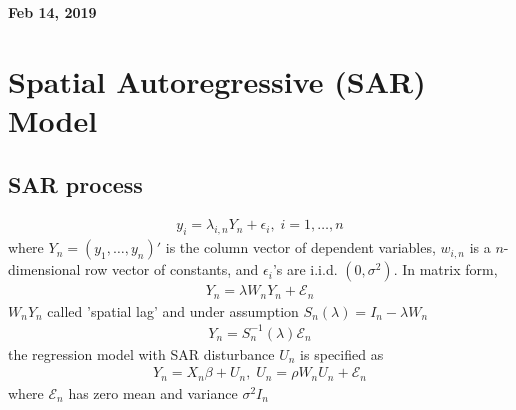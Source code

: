 \documentclass[11pt]{article}
\begin{document}
%

\newcommand{\Ito}{$It\hat{o}$'$s~Lemma$}

\newcommand\ind{\stackrel{\rm ind}{\sim}}
\newcommand\iid{\stackrel{\rm iid}{\sim}}
\renewcommand\c{\mathbf{c}}
\newcommand\y{\mathbf{y}}
\newcommand\z{\mathbf{z}}
\renewcommand\P{\mathbf{P}}
\newcommand\W{\mathbf{W}}
\newcommand\X{\mathbf{X}}
\newcommand\Y{\mathbf{Y}}
\newcommand\Z{\mathbf{Z}}
\newcommand\J{{\cal J}}
\newcommand\B{{\cal B}}
\newcommand\K{{\cal K}}
\newcommand\N{{\rm N}}
\newcommand\bs{\boldsymbol}
\newcommand\bth{\bs\theta}
\newcommand\bbe{\bs\beta}
\renewcommand\*{^\star}

\def\spacingset#1{\renewcommand{\baselinestretch}%
{#1}\small\normalsize} \spacingset{1}



  \bigskip
  \bigskip
  \bigskip
  \begin{center}
    {\LARGE\bf Feb 14, 2019 }
  \end{center}
  \medskip



\spacingset{1.45}



\section{Spatial Autoregressive (SAR) Model}
\subsection{SAR process}
\begin{align}
y_i = \lambda_{i,n}Y_n + \epsilon_i, \; i = 1 ,\dots , n \nonumber
\end{align}
where $Y_n = (y_1, \dots, y_n)'$ is the column vector of dependent variables, $w_{i,n}$ is a $n$-dimensional row vector of constants, and $\epsilon_i$'s are i.i.d. $(0,\sigma^2)$. In matrix form,
\begin{align}
Y_n = \lambda W_n Y_n + \mathcal{E}_n \nonumber
\end{align}
$W_n Y_n$ called 'spatial lag' and under assumption $S_n(\lambda) = I_n - \lambda W_n$
\begin{align}
Y_n =S_n^{-1}(\lambda) \mathcal{E}_n  \nonumber
\end{align}
the regression model with SAR disturbance $U_n$ is specified as
\begin{align}
Y_n = X_n \beta + U_n, \; U_n = \rho W_n U_n + \mathcal{E}_n \nonumber
\end{align}
where $\mathcal{E}_n$ has zero mean and variance $\sigma^2 I_n$
\end{document}
